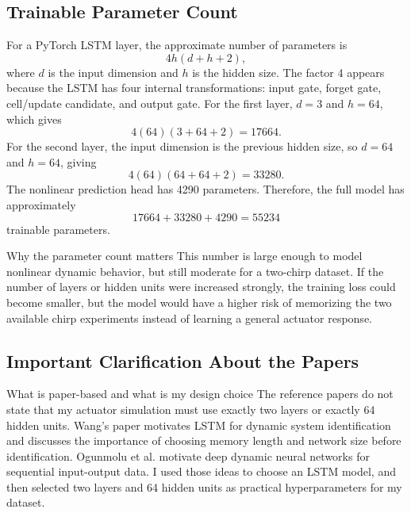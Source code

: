\documentclass[11pt]{article}
\begin{document}
\subsection{Trainable Parameter Count}
For a PyTorch LSTM layer, the approximate number of parameters is
\begin{equation}
4h(d+h+2),
\end{equation}
where $d$ is the input dimension and $h$ is the hidden size. The factor 4 appears because the LSTM has four internal transformations: input gate, forget gate, cell/update candidate, and output gate. For the first layer, $d=3$ and $h=64$, which gives
\begin{equation}
4(64)(3+64+2)=17664.
\end{equation}
For the second layer, the input dimension is the previous hidden size, so $d=64$ and $h=64$, giving
\begin{equation}
4(64)(64+64+2)=33280.
\end{equation}
The nonlinear prediction head has 4290 parameters. Therefore, the full model has approximately
\begin{equation}
17664+33280+4290=55234
\end{equation}
trainable parameters.
\begin{parameterdecisionbox}{Why the parameter count matters}
This number is large enough to model nonlinear dynamic behavior, but still moderate for a two-chirp dataset. If the number of layers or hidden units were increased strongly, the training loss could become smaller, but the model would have a higher risk of memorizing the two available chirp experiments instead of learning a general actuator response.
\end{parameterdecisionbox}

\subsection{Important Clarification About the Papers}
\begin{paperdecisionbox}{What is paper-based and what is my design choice}
The reference papers do not state that my actuator simulation must use exactly two layers or exactly 64 hidden units. Wang's paper motivates LSTM for dynamic system identification and discusses the importance of choosing memory length and network size before identification. Ogunmolu et al. motivate deep dynamic neural networks for sequential input-output data. I used those ideas to choose an LSTM model, and then selected two layers and 64 hidden units as practical hyperparameters for my dataset.
\end{paperdecisionbox}
\end{document}
